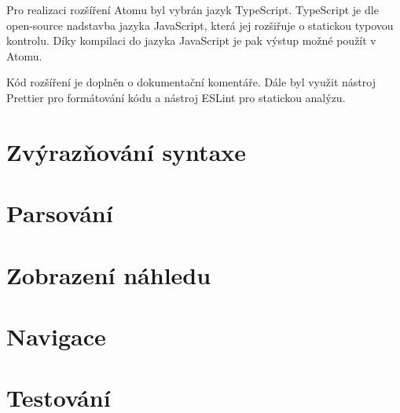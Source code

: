 Pro realizaci rozšíření Atomu byl vybrán jazyk TypeScript. TypeScript je dle \cite{ts-docs} open-source nadstavba jazyka
JavaScript, která jej rozšiřuje o statickou typovou kontrolu. Díky kompilaci do jazyka JavaScript je pak výstup možné
použít v Atomu.

Kód rozšíření je doplněn o dokumentační komentáře. Dále byl využit nástroj Prettier pro formátování kódu a nástroj
ESLint pro statickou analýzu.

\section{Zvýrazňování syntaxe}


\section{Parsování}


\section{Zobrazení náhledu}


\section{Navigace}


\section{Testování}

